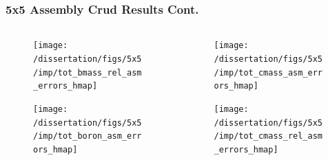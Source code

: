\documentclass[t, pdftex]{beamer}
\begin{document}
\begin{frame}
\frametitle{5x5 Assembly Crud Results Cont.}
\vspace{-42pt}
\begin{columns}
    \begin{column}{0.5\textwidth}
        \begin{figure}[H]%
            \texttt{[image: /dissertation/figs/5x5/imp/tot\_bmass\_rel\_asm\_errors\_hmap]}
        \end{figure}
        \vspace{-26pt}
        \begin{figure}[H]%
            \texttt{[image: /dissertation/figs/5x5/imp/tot\_boron\_asm\_errors\_hmap]}
        \end{figure}
    \end{column}
    \begin{column}{0.5\textwidth}
        \begin{figure}[H]%
            \texttt{[image: /dissertation/figs/5x5/imp/tot\_cmass\_asm\_errors\_hmap]}
        \end{figure}
        \vspace{-26pt}
        \begin{figure}[H]%
            \texttt{[image: /dissertation/figs/5x5/imp/tot\_cmass\_rel\_asm\_errors\_hmap]}
        \end{figure}
    \end{column}
\end{columns}
\end{frame}
\end{document}
